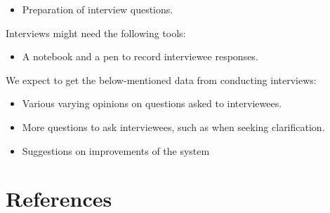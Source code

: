 \documentclass[12pt,svgnames,smaller]{article} %
\begin{document}
\begin{enumerate}
		\begin{itemize}
			\item Preparation of interview questions.
		\end{itemize}
				
		Interviews might need the following tools:
				
		\begin{itemize}
			\item A notebook and a pen to record interviewee responses.
		\end{itemize}
				
		We expect to get the below-mentioned data from conducting interviews:
				
		\begin{itemize}
			\item Various varying opinions on questions asked to interviewees.
			\item More questions to ask interviewees, such as when seeking clarification.
			\item Suggestions on improvements of the system 
		\end{itemize}
				
		
	\end{enumerate}

	
	\clearpage
	
	
	\newpage
	
	\section{\textbf{ References } } 
	
\end{document}
